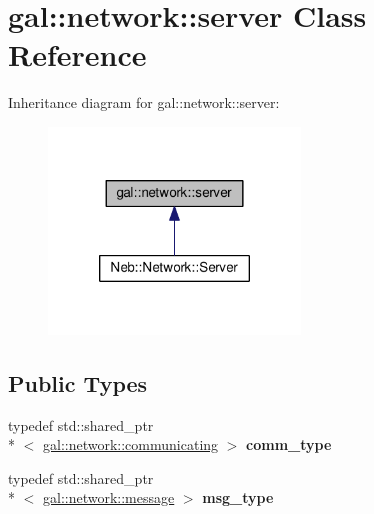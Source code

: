 \hypertarget{classgal_1_1network_1_1server}{\section{gal\-:\-:network\-:\-:server Class Reference}
\label{classgal_1_1network_1_1server}
}


Inheritance diagram for gal\-:\-:network\-:\-:server\-:
\nopagebreak
\begin{figure}[H]
\begin{center}
\leavevmode
\includegraphics[width=190pt]{classgal_1_1network_1_1server__inherit__graph}
\end{center}
\end{figure}
\subsection*{Public Types}
\begin{DoxyCompactItemize}
\item 
\hypertarget{classgal_1_1network_1_1server_acbafca892f88a98a240d1451c9701aba}{typedef std\-::shared\-\_\-ptr\\*
$<$ \hyperlink{classgal_1_1network_1_1communicating}{gal\-::network\-::communicating} $>$ {\bfseries comm\-\_\-type}}\label{classgal_1_1network_1_1server_acbafca892f88a98a240d1451c9701aba}

\item 
\hypertarget{classgal_1_1network_1_1server_a4efd79e0ef406678f3f99bae5c50a9a8}{typedef std\-::shared\-\_\-ptr\\*
$<$ \hyperlink{classgal_1_1network_1_1message}{gal\-::network\-::message} $>$ {\bfseries msg\-\_\-type}}\label{classgal_1_1network_1_1server_a4efd79e0ef406678f3f99bae5c50a9a8}

\end{DoxyCompactItemize}
